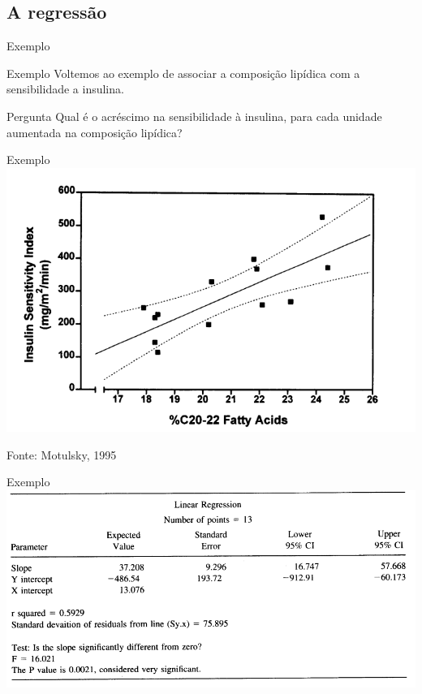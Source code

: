 \documentclass{beamer}
\begin{document}
\subsection{A regressão}

\begin{frame}{Exemplo}
  \begin{exampleblock}{Exemplo}
    Voltemos ao exemplo de associar a composição lipídica com a sensibilidade a insulina.    
  \end{exampleblock}
  \begin{block}{Pergunta}
    Qual é o acréscimo na sensibilidade à insulina, para cada unidade aumentada na composição lipídica?
  \end{block}
\end{frame}

\begin{frame}{Exemplo}
  \centering
  \includegraphics[width=.9\textwidth]{Cap18-19/regressao1}

  \vfill
  Fonte: Motulsky, 1995
\end{frame}

\begin{frame}{Exemplo}
  \centering
  \includegraphics[width=1.2\textwidth]{Cap18-19/regressao2}
\end{frame}
\end{document}
